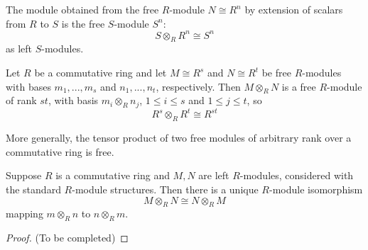 \documentclass[12pt, a4paper, oneside, openright, titlepage]{book}
\begin{document}
\begin{cor}
    The module obtained from the free $R$-module $N \cong R^n$ by extension of scalars from $R$ to $S$ is the free $S$-module $S^n$: \begin{equation*}
        S\otimes_R R^n \cong S^n
    \end{equation*}
    as left $S$-modules.
\end{cor}

\begin{cor}
    Let $R$ be a commutative ring and let $M \cong R^s$ and $N \cong R^t$ be free $R$-modules with bases $m_1,...,m_s$ and $n_1,...,n_t$, respectively. Then $M\otimes_RN$ is a free $R$-module of rank $st$, with basis $m_i\otimes_Rn_j$, $1\leq i \leq s$ and $1 \leq j \leq t$, so \begin{equation*}
        R^s\otimes_RR^t\cong R^{st}
    \end{equation*}
\end{cor}

More generally, the tensor product of two free modules of arbitrary rank over a commutative ring is free.


\begin{prop}
    Suppose $R$ is a commutative ring and $M,N$ are left $R$-modules, considered with the standard $R$-module structures. Then there is a unique $R$-module isomorphism \begin{equation*}
        M\otimes_RN\cong N\otimes_RM
    \end{equation*}
    mapping $m\otimes_Rn$ to $n\otimes_Rm$.
\end{prop}
\begin{proof}
    (To be completed)
\end{proof}
\end{document}
